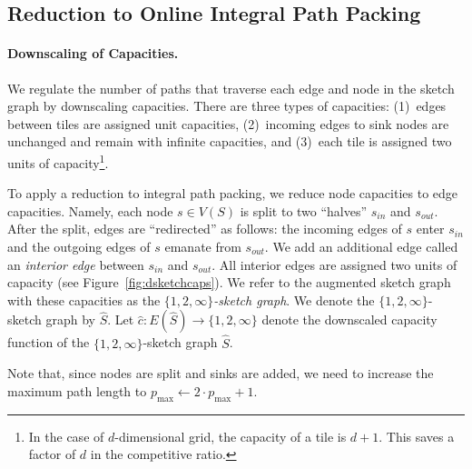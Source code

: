 \documentclass[11pt]{article}
\newcommand{\pmax}{p_{\max}}
\newenvironment{proof sketch}[1]{\noindent {\emph{Proof sketch of #1:}}}{\hfill \qed}
\begin{document}
\subsection{Reduction to Online Integral Path Packing}\label{sec:reduce}
\begin{comment}
  The reduction to path packing has to deal with these issues:
  \begin{inparaenum}[(i)]
  \item Handling requests \emph{inside} a tile.
  \item bounding the loads on the sketch edges.
  \item Determining a specific destination node per request.
  \end{inparaenum} To deal with these issues, we augment the sketch graph as follows.
\end{comment}

\paragraph{Downscaling of Capacities.}
We regulate the number of paths that traverse each edge and node in the sketch graph
by downscaling capacities.  There are three types of capacities: (1)~edges between
tiles are assigned unit capacities, (2)~incoming edges to sink nodes are unchanged
and remain with infinite capacities, and (3)~each tile is assigned two units of
capacity\footnote{In the case of $d$-dimensional grid, the capacity of a tile is
  $d+1$. This saves a factor of $d$ in the competitive ratio.}.

To apply a reduction to integral path packing, we reduce node capacities to edge
capacities. Namely, each node $s \in V(S)$ is split to two ``halves'' $s_{in}$ and
$s_{out}$. After the split, edges are ``redirected'' as follows: the incoming edges
of $s$ enter $s_{in}$ and the outgoing edges of $s$ emanate from $s_{out}$. We add an
additional edge called an \emph{interior edge} between $s_{in}$ and $s_{out}$.  All
interior edges are assigned two units of capacity (see Figure~\ref{fig:dsketchcaps}).  We refer to the augmented sketch
graph with these capacities as the \emph{$\{1,2,\infty\}$-sketch graph}. We denote
the $\{1,2,\infty\}$-sketch graph by $\hat S$.
Let $\hat c:E(\hat S) \rightarrow \{1,2,\infty\}$ denote the downscaled capacity function of the $\{1,2,\infty\}$-sketch graph $\hat S$.

Note that, since nodes are split and sinks are added, we need to increase the maximum path length to $\pmax\leftarrow 2\cdot \pmax+1$.
\end{document}
